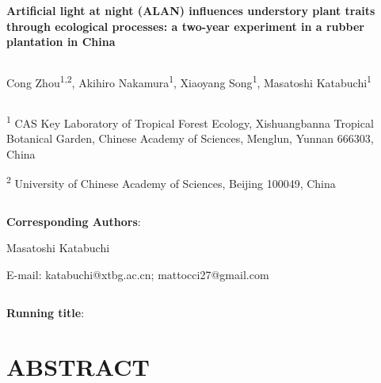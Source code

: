 \documentclass[
  12pt,
  letterpaper,
  DIV=11,
  numbers=noendperiod]{scrartcl}
\author{}
\date{}
\providecommand{\DIFaddbegin}{} %
\providecommand{\DIFaddend}{} %
\providecommand{\DIFdelbegin}{} %
\providecommand{\DIFdelend}{} %
\newcommand{\DIFscaledelfig}{0.5}
\newlength{\DIFdelgraphicswidth} %
\newlength{\DIFdelgraphicsheight} %
\newcommand{\DIFaddincludegraphics}[2][]{{\color{blue}\fbox{\DIFOincludegraphics[#1]{#2}}}} %
\newcommand{\DIFdelincludegraphics}[2][]{%
\sbox{\DIFdelgraphicsbox}{\DIFOincludegraphics[#1]{#2}}%
\settoboxwidth{\DIFdelgraphicswidth}{\DIFdelgraphicsbox} %
\settoboxtotalheight{\DIFdelgraphicsheight}{\DIFdelgraphicsbox} %
\scalebox{\DIFscaledelfig}{%
\parbox[b]{\DIFdelgraphicswidth}{\usebox{\DIFdelgraphicsbox}\\[-\baselineskip] \rule{\DIFdelgraphicswidth}{0em}}\llap{\resizebox{\DIFdelgraphicswidth}{\DIFdelgraphicsheight}{%
\setlength{\unitlength}{\DIFdelgraphicswidth}%
\begin{picture}(1,1)%
\thicklines\linethickness{2pt} %
{\color[rgb]{1,0,0}\put(0,0){\framebox(1,1){}}}%
{\color[rgb]{1,0,0}\put(0,0){\line( 1,1){1}}}%
{\color[rgb]{1,0,0}\put(0,1){\line(1,-1){1}}}%
\end{picture}%
}\hspace*{3pt}}} %
} %
\DeclareRobustCommand{\DIFaddbegin}{\DIFOaddbegin \let\includegraphics\DIFaddincludegraphics} %
\DeclareRobustCommand{\DIFaddend}{\DIFOaddend \let\includegraphics\DIFOincludegraphics} %
\DeclareRobustCommand{\DIFdelbegin}{\DIFOdelbegin \let\includegraphics\DIFdelincludegraphics} %
\DeclareRobustCommand{\DIFdelend}{\DIFOaddend \let\includegraphics\DIFOincludegraphics} %
\begin{document}
\ifdefined\Shaded\DIFdelbegin %
\DIFdelend \DIFaddbegin \renewenvironment{Shaded}{\begin{tcolorbox}[enhanced, interior hidden, borderline west={3pt}{0pt}{shadecolor}, frame hidden, breakable, sharp corners, boxrule=0pt]}{\end{tcolorbox}}\DIFaddend \fi

\textbf{Artificial light at night (ALAN) influences understory plant
traits through ecological processes: a two-year experiment in a rubber
plantation in China}

\[ \]

Cong Zhou\textsuperscript{1,2}, Akihiro Nakamura\textsuperscript{1},
Xiaoyang Song\textsuperscript{1}, Masatoshi Katabuchi\textsuperscript{1}

\[ \]

\textsuperscript{1} CAS Key Laboratory of Tropical Forest Ecology,
Xishuangbanna Tropical Botanical Garden, Chinese Academy of Sciences,
Menglun, Yunnan 666303, China

\textsuperscript{2} University of Chinese Academy of Sciences, Beijing
100049, China

\[ \]

\textbf{Corresponding Authors}:

Masatoshi Katabuchi

E-mail: katabuchi@xtbg.ac.cn; mattocci27@gmail.com

\[ \]

\textbf{Running title}:

\newpage

\hypertarget{abstract}{%
\section{ABSTRACT}\label{abstract}}
\end{document}
